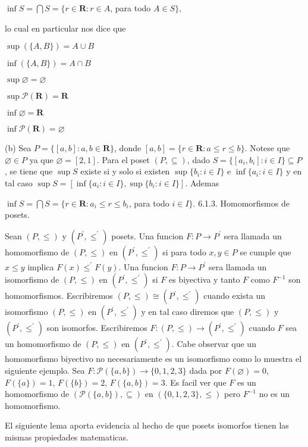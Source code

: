 \(\inf S=\bigcap S=\{r\in \mathbf{R}:r\in A\), para todo \(A\in S\},\)

lo cual en particular nos dice que

\(\sup (\{A,B\})=A\cup B\)

\(\inf (\{A,B\})=A\cap B\)

\(\sup \varnothing =\varnothing \)

\(\sup \mathcal{P}(\mathbf{R})=\mathbf{R}\)

\(\inf \varnothing =\mathbf{R}\)

\(\inf \mathcal{P}(\mathbf{R})=\varnothing \)

(b) Sea \(P=\{[a,b]:a,b\in \mathbf{R\}}\), donde \([a,b]=\{r\in \mathbf{R} :a\leq r\leq b\}\). Notese que \(\varnothing \in P\) ya que \(\varnothing =[2,1]\). Para el poset \((P,\subseteq )\), dado \(S=\{[a_{i},b_{i}]:i\in I\}\subseteq P\) , se tiene que \(\sup S\) existe si y solo si existen \(\sup \{b_{i}:i\in I\}\) e \(\inf \{a_{i}:i\in I\}\) y en tal caso \(\sup S=[\inf \{a_{i}:i\in I\},\sup \{b_{i}:i\in I\}]\). Ademas

\(\inf S=\bigcap S=\{r\in \mathbf{R}:a_{i}\leq r\leq b_{i}\), para todo \(i\in I\}\).
6.1.3. Homomorfismos de posets.

Sean \((P,\leq )\) y \((P^{\prime },\leq ^{\prime })\) posets. Una funcion \( F:P\rightarrow P^{\prime }\) sera llamada un homomorfismo de \( (P,\leq )\) en \((P^{\prime },\leq ^{\prime })\) si para todo \(x,y\in P \) se cumple que \(x\leq y\) implica \(F(x)\leq ^{\prime }F(y)\). Una funcion \( F:P\rightarrow P^{\prime }\) sera llamada un isomorfismo de \((P,\leq )\) en \((P^{\prime },\leq ^{\prime })\) si \(F\) es biyectiva y tanto \( F\) como \(F^{-1}\) son homomorfismos. Escribiremos \((P,\leq )\cong (P^{\prime },\leq ^{\prime })\) cuando exista un isomorfismo \((P,\leq )\) en \((P^{\prime },\leq ^{\prime })\) y en tal caso diremos que \((P,\leq )\) y \((P^{\prime },\leq ^{\prime })\) son isomorfos. Escribiremos \(F:(P,\leq )\rightarrow (P^{\prime },\leq ^{\prime })\) cuando \(F\) sea un homomorfismo de \((P,\leq )\) en \((P^{\prime },\leq ^{\prime })\). Cabe observar que un homomorfismo biyectivo no necesariamente es un isomorfismo como lo muestra el siguiente ejemplo. Sea \(F:\mathcal{P}(\{a,b\})\rightarrow \{0,1,2,3\}\) dada por \(F(\varnothing )=0\), \(F(\{a\})=1\), \(F(\{b\})=2\), \( F(\{a,b\})=3\). Es facil ver que \(F\) es un homomorfismo de \((\mathcal{P} (\{a,b\}),\subseteq )\) en \((\{0,1,2,3\},\leq )\) pero \(F^{-1}\) no es un homomorfismo.

El siguiente lema aporta evidencia al hecho de que posets isomorfos tienen las mismas propiedades matematicas.

